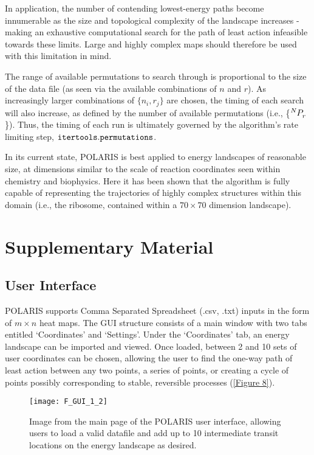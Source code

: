 \documentclass[twocolumn]{biophys-new}
\begin{document}
In application, the number of contending lowest-energy paths become innumerable as the size and topological complexity of the landscape increases - making an exhaustive computational search for the path of least action infeasible towards these limits. Large and highly complex maps should therefore be used with this limitation in mind. 

The range of available permutations to search through is proportional to the size of the data file (as seen via the available combinations of $n$ and $r$). As increasingly larger combinations of $\{n_i, r_j\}$ are chosen, the timing of each search will also increase, as defined by the number of available permutations (i.e., \{$\tensor*[^{N}_{}]{P}{^{}_r}$\}). Thus, the timing of each run is ultimately governed by the algorithm's rate limiting step, $\tt{itertools.permutations}$.

In its current state, POLARIS is best applied to energy landscapes of reasonable size, at dimensions similar to the scale of reaction coordinates seen within chemistry and biophysics. Here it has been shown that the algorithm is fully capable of representing the trajectories of highly complex structures within this domain (i.e., the ribosome, contained within a $70{\times}70$ dimension landscape).

\newpage 



\section*{Supplementary Material}

\subsection*{User Interface}

POLARIS supports Comma Separated Spreadsheet (.csv, .txt) inputs in the form of $m\times n$ heat maps. The GUI structure consists of a main window with two tabs entitled `Coordinates' and `Settings'. Under the `Coordinates' tab, an energy landscape can be imported and viewed. Once loaded, between 2 and 10 sets of user coordinates can be chosen, allowing the user to find the one-way path of least action between any two points, a series of points, or creating a cycle of points possibly corresponding to stable, reversible processes (\autoref{Figure 8}).

\setcounter{figure}{7} 
\begin{figure}[hbt!]
\centering
\texttt{[image: F\_GUI\_1\_2]}
\caption{Image from the main page of the POLARIS user interface, allowing users to load a valid datafile and add up to 10 intermediate transit locations on the energy landscape as desired.} 
\label{Figure 8}
\end{figure}
\end{document}
